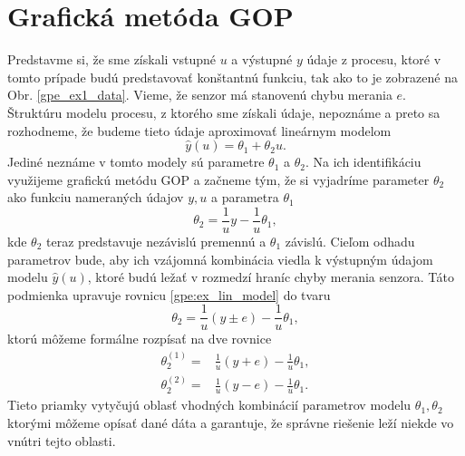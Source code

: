 \section{Grafická metóda GOP}
Predstavme si, že sme získali vstupné $ u $ a výstupné $ y $ údaje z procesu, ktoré v tomto prípade budú predstavovať konštantnú funkciu, tak ako to je zobrazené na Obr. \ref{gpe_ex1_data}. Vieme, že senzor 
má stanovenú chybu merania $ e $. Štruktúru modelu procesu, z ktorého sme získali údaje, nepoznáme a preto sa rozhodneme, že
budeme tieto údaje aproximovať lineárnym modelom
\begin{equation}
	\hat{y}(u) = \theta_1 + \theta_2u.
\end{equation}
 Jediné neznáme v tomto modely sú parametre $ \theta_1 $ a $ \theta_2 $. Na ich identifikáciu využijeme grafickú metódu GOP a začneme tým, že si vyjadríme parameter $ \theta_2 $ ako funkciu nameraných údajov $ y, u $ a parametra $ \theta_1 $
\begin{equation} \label{gpe:ex_lin_model}
	\theta_2 = \frac{1}{u}y - \frac{1}{u}\theta_1,
\end{equation}
kde $ \theta_2 $ teraz predstavuje nezávislú premennú a $ \theta_1 $ závislú. Cieľom odhadu parametrov bude, aby ich vzájomná kombinácia viedla k výstupným údajom modelu $ \hat{y}(u) $, ktoré budú ležať v rozmedzí hraníc chyby merania senzora. Táto podmienka upravuje rovnicu \ref{gpe:ex_lin_model} do tvaru
\begin{equation}
	\theta_2 = \frac{1}{u}\left(y \pm e\right) - \frac{1}{u}\theta_1,
\end{equation}
ktorú môžeme formálne rozpísať na dve rovnice 
\begin{equation}
	\begin{split}
		\theta_2^{(1)} =& \frac{1}{u}\left(y + e\right) - \frac{1}{u}\theta_1,\\
		\theta_2^{(2)} =& \frac{1}{u}\left(y - e\right) - \frac{1}{u}\theta_1.
	\end{split} 
\end{equation}
Tieto priamky vytyčujú oblasť vhodných kombinácií parametrov modelu $ \theta_1, \theta_2 $ ktorými môžeme opísať dané dáta a garantuje, že správne riešenie leží niekde vo vnútri tejto oblasti.

